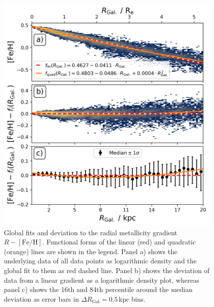 \documentclass[twocolumn,apj,numberedappendix,appendixfloats,twocolappendix]{openjournal}
\begin{document}
\begin{CJK*}{UTF8}{gbsn}
\begin{figure}
    \centering
    \includegraphics[width=\columnwidth]{figures/global_r_feh_fit.png}
    \caption{Global fits and deviation to the radial metallicity gradient $R-\mathrm{[Fe/H]}$. Functional forms of the linear (red) and quadratic (orange) lines are shown in the legend. Panel a) shows the underlying data of all data points as logarithmic density and the global fit to them as red dashed line. Panel b) shows the deviation of data from a linear gradient as a logarithmic density plot, whereas panel c) shows the 16th and 84th percentile around the median deviation as error bars in $\Delta R_\mathrm{Gal} = 0.5\,\mathrm{kpc}$ bins.}
    \label{fig:global_r_feh_fit}
\end{figure}


\end{CJK*}
\end{document}
